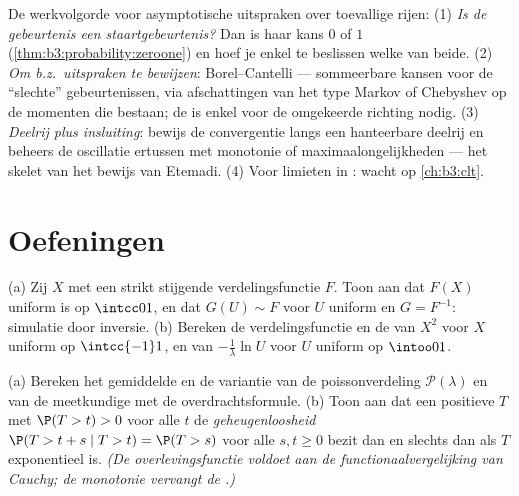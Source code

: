 \begin{method}\label{met:b3:probability:toolkit}
De werkvolgorde voor asymptotische uitspraken over toevallige
rijen: (1) \emph{Is de gebeurtenis een staartgebeurtenis?} Dan is
haar kans $0$ of $1$ (\cref{thm:b3:probability:zeroone}) en hoef
je enkel te beslissen welke van beide. (2) \emph{Om b.z.\
uitspraken te bewijzen}: Borel--Cantelli --- sommeerbare kansen
voor de ``slechte'' gebeurtenissen, via afschattingen van het
type Markov of Chebyshev op de momenten die bestaan; de
 is enkel voor de omgekeerde richting nodig. (3)
\emph{Deelrij plus insluiting}: bewijs de convergentie langs een
hanteerbare deelrij en beheers de oscillatie ertussen met
monotonie of maximaalongelijkheden --- het skelet van het bewijs
van Etemadi. (4) Voor limieten in : wacht op
\cref{ch:b3:clt}.
\end{method}

\section{Oefeningen}

\begin{exercise}[$\star$]\label{exo:b3:probability:1}
(a) Zij $X$ met een  strikt stijgende verdelingsfunctie
$F$. Toon aan dat $F(X)$ uniform is op $\intcc01$, en dat $G(U)
\sim F$ voor $U$ uniform en $G = F^{-1}$: simulatie door
inversie.
(b) Bereken de verdelingsfunctie en de  van $X^2$ voor
$X$ uniform op $\intcc{-1}1$, en van $-\frac1\lambda\ln U$ voor
$U$ uniform op $\intoo01$.
\end{exercise}

\begin{exercise}[$\star$]\label{exo:b3:probability:2}
(a) Bereken het gemiddelde en de variantie van de
poissonverdeling $\mathcal P(\lambda)$ en van de meetkundige
 met de overdrachtsformule.
(b) Toon aan dat een positieve  $T$ met $\P(T
> t) > 0$ voor alle $t$ de \emph{geheugenloosheid} $\P(T > t + s
\mid T > t) = \P(T > s)$ voor alle $s, t \geq 0$ bezit dan en
slechts dan als $T$ exponentieel is. \emph{(De overlevingsfunctie
voldoet aan de functionaalvergelijking van Cauchy; de monotonie
vervangt de .)}
\end{exercise}

